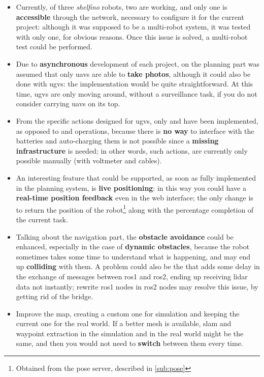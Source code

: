 \begin{itemize}

\item Currently, of three \textit{shelfino} robots, two are working, and only one is \textbf{accessible} through the network, necessary to configure it for the current project: although it was supposed to be a multi-robot system, it was tested with only one, for obvious reasons. Once this issue is solved, a multi-robot test could be performed.

\item Due to \textbf{asynchronous} development of each project, on the planning part was assumed that only \acrshort{uavs} are able to \textbf{take photos}, although it could also be done with \acrshort{ugvs}: the implementation would be quite straightforward. At this time, \acrshort{ugvs} are only moving around, without a surveillance task, if you do not consider carrying \acrshort{uavs} on its top.

\item From the specific actions designed for \acrshort{ugvs}, only  and  have been implemented, as opposed to  and  operations, because there is \textbf{no way} to interface with the batteries and auto-charging them is not possible since a \textbf{missing infrastructure} is needed; in other words, such actions, are currently only possible manually (with voltmeter and cables).

\item An interesting feature that could be supported, as soon as fully implemented in the planning system, is \textbf{live positioning}: in this way you could have a \textbf{real-time position feedback} even in the web interface; the only change is to return the position of the robot\footnote{Obtained from the pose server, described in \autoref{sub:pose}} along with the percentage completion of the current task.

\item Talking about the navigation part, the \textbf{obstacle avoidance} could be enhanced, especially in the case of \textbf{dynamic obstacles}, because the robot sometimes takes some time to understand what is happening, and may end up \textbf{colliding} with them. A problem could also be the  that adds some delay in the exchange of messages between \acrshort{ros}1 and \acrshort{ros}2, ending up receiving lidar data not instantly; rewrite \acrshort{ros}1 nodes in \acrshort{ros}2 nodes may resolve this issue, by getting rid of the bridge.

\item Improve the map, creating a custom one for simulation and keeping the current one for the real world. If a better mesh is available, \acrshort{slam} and waypoint extraction in the simulation and in the real world might be the same, and then you would not need to \textbf{switch} between them every time.

\end{itemize}